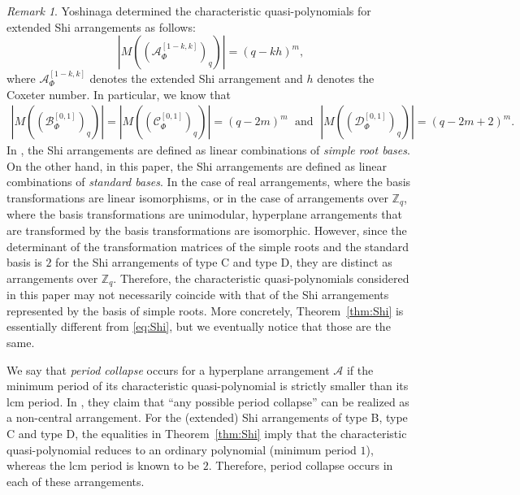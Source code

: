 \documentclass{article}
\theoremstyle{plain}
\theoremstyle{definition}
\theoremstyle{remark}
\newtheorem{rem}[Them]{Remark}
\numberwithin{equation}{section}
\begin{document}
\begin{rem}\label{rem-basis-transform}
Yoshinaga \cite[Theorem 5.1]{Yoshinaga2018} determined the characteristic quasi-polynomials for extended Shi arrangements as follows: 
\[\left|M((\mathcal{A}_\Phi^{[1-k,k]})_q)\right| = (q-kh)^m,\]
where $\mathcal{A}_\Phi^{[1-k,k]}$ denotes the extended Shi arrangement and $h$ denotes the Coxeter number. 
In particular, we know that 
\begin{align}\label{eq:Shi}
    \left|M((\mathcal{B}_\Phi^{[0,1]})_q)\right| = \left|M((\mathcal{C}_\Phi^{[0,1]})_q)\right| = (q-2m)^m \;\text{ and }\; \left|M((\mathcal{D}_\Phi^{[0,1]})_q)\right|=(q-2m+2)^m.
\end{align}
In \cite{Yoshinaga2018}, the Shi arrangements are defined as linear combinations of \textit{simple root bases}. 
On the other hand, in this paper, the Shi arrangements are defined as linear combinations of \textit{standard bases}. 
In the case of real arrangements, where the basis transformations are linear isomorphisms, or in the case of arrangements over $\mathbb{Z}_q$, 
where the basis transformations are unimodular, hyperplane arrangements that are transformed by the basis transformations are isomorphic. 
However, since the determinant of the transformation matrices of the simple roots and the standard basis is $2$ for the Shi arrangements of type C and type D, they are distinct as arrangements over $\mathbb{Z}_q$. 
Therefore, the characteristic quasi-polynomials considered in this paper may not necessarily coincide with that of the Shi arrangements represented by the basis of simple roots. 
More concretely, Theorem~\ref{thm:Shi} is essentially different from \eqref{eq:Shi}, but we eventually notice that those are the same. 
\end{rem}

We say that \textit{period collapse} occurs for a hyperplane arrangement $\mathcal{A}$ if the minimum period of its characteristic quasi-polynomial is strictly smaller than its lcm period. 
In \cite{HTY2023}, %
they claim that “any possible period collapse” can be realized as a non-central arrangement. 
For the (extended) Shi arrangements of type B, type C and type D, the equalities in Theorem~\ref{thm:Shi} imply that the characteristic quasi-polynomial reduces to an ordinary polynomial (minimum period $1$), whereas the lcm period is known to be $2$. 
Therefore, period collapse occurs in each of these arrangements.
\end{document}
